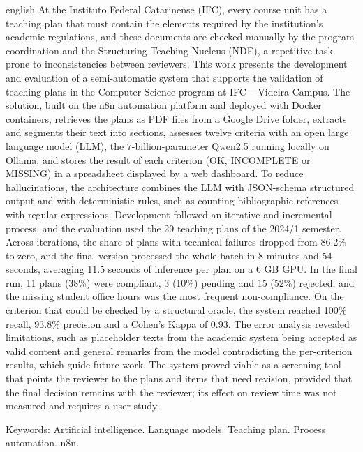 \begin{resumo}[Abstract]
\begin{otherlanguage*}{english}
\noindent
At the Instituto Federal Catarinense (IFC), every course unit has a teaching plan that must contain the elements required by the institution's academic regulations, and these documents are checked manually by the program coordination and the Structuring Teaching Nucleus (NDE), a repetitive task prone to inconsistencies between reviewers. This work presents the development and evaluation of a semi-automatic system that supports the validation of teaching plans in the Computer Science program at IFC -- Videira Campus. The solution, built on the n8n automation platform and deployed with Docker containers, retrieves the plans as PDF files from a Google Drive folder, extracts and segments their text into sections, assesses twelve criteria with an open large language model (LLM), the 7-billion-parameter Qwen2.5 running locally on Ollama, and stores the result of each criterion (OK, INCOMPLETE or MISSING) in a spreadsheet displayed by a web dashboard. To reduce hallucinations, the architecture combines the LLM with JSON-schema structured output and with deterministic rules, such as counting bibliographic references with regular expressions. Development followed an iterative and incremental process, and the evaluation used the 29 teaching plans of the 2024/1 semester. Across iterations, the share of plans with technical failures dropped from 86.2\% to zero, and the final version processed the whole batch in 8 minutes and 54 seconds, averaging 11.5 seconds of inference per plan on a 6 GB GPU. In the final run, 11 plans (38\%) were compliant, 3 (10\%) pending and 15 (52\%) rejected, and the missing student office hours was the most frequent non-compliance. On the criterion that could be checked by a structural oracle, the system reached 100\% recall, 93.8\% precision and a Cohen's Kappa of 0.93. The error analysis revealed limitations, such as placeholder texts from the academic system being accepted as valid content and general remarks from the model contradicting the per-criterion results, which guide future work. The system proved viable as a screening tool that points the reviewer to the plans and items that need revision, provided that the final decision remains with the reviewer; its effect on review time was not measured and requires a user study.

\vspace{0.2cm}
\noindent Keywords: Artificial intelligence. Language models. Teaching plan. Process automation. n8n.
\end{otherlanguage*}
\end{resumo}
